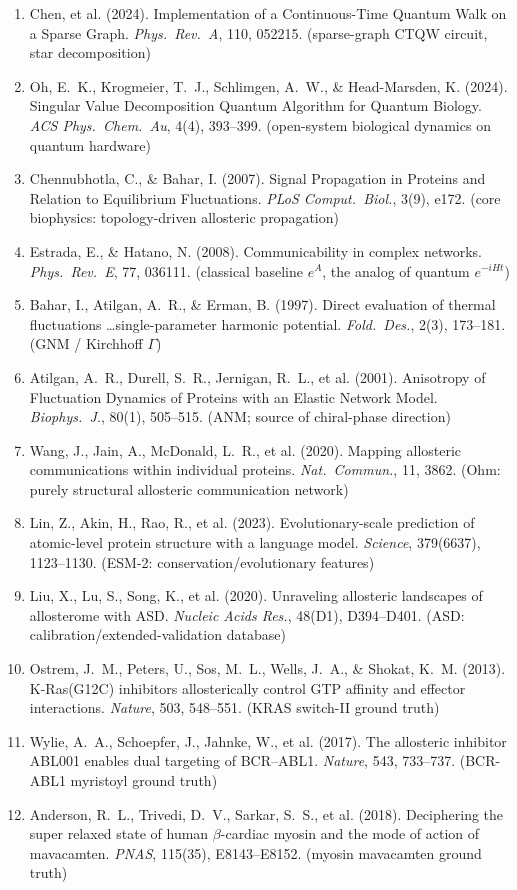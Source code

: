 \documentclass[11pt,a4paper]{article}
\newcommand{\note}[1]{{\color{grey}\small #1}}
\begin{document}
{\begin{enumerate}[leftmargin=1.6em,itemsep=1pt]
\item Chen, et al. (2024). Implementation of a Continuous-Time Quantum Walk on a Sparse Graph. \emph{Phys.\ Rev.\ A}, 110, 052215. \note{(sparse-graph CTQW circuit, star decomposition)}
\item Oh, E.~K., Krogmeier, T.~J., Schlimgen, A.~W., \& Head-Marsden, K. (2024). Singular Value Decomposition Quantum Algorithm for Quantum Biology. \emph{ACS Phys.\ Chem.\ Au}, 4(4), 393--399. \note{(open-system biological dynamics on quantum hardware)}
\item Chennubhotla, C., \& Bahar, I. (2007). Signal Propagation in Proteins and Relation to Equilibrium Fluctuations. \emph{PLoS Comput.\ Biol.}, 3(9), e172. \note{(core biophysics: topology-driven allosteric propagation)}
\item Estrada, E., \& Hatano, N. (2008). Communicability in complex networks. \emph{Phys.\ Rev.\ E}, 77, 036111. \note{(classical baseline $e^{A}$, the analog of quantum $e^{-iHt}$)}
\item Bahar, I., Atilgan, A.~R., \& Erman, B. (1997). Direct evaluation of thermal fluctuations \ldots single-parameter harmonic potential. \emph{Fold.\ Des.}, 2(3), 173--181. \note{(GNM / Kirchhoff $\Gamma$)}
\item Atilgan, A.~R., Durell, S.~R., Jernigan, R.~L., et al. (2001). Anisotropy of Fluctuation Dynamics of Proteins with an Elastic Network Model. \emph{Biophys.\ J.}, 80(1), 505--515. \note{(ANM; source of chiral-phase direction)}
\item Wang, J., Jain, A., McDonald, L.~R., et al. (2020). Mapping allosteric communications within individual proteins. \emph{Nat.\ Commun.}, 11, 3862. \note{(Ohm: purely structural allosteric communication network)}
\item Lin, Z., Akin, H., Rao, R., et al. (2023). Evolutionary-scale prediction of atomic-level protein structure with a language model. \emph{Science}, 379(6637), 1123--1130. \note{(ESM-2: conservation/evolutionary features)}
\item Liu, X., Lu, S., Song, K., et al. (2020). Unraveling allosteric landscapes of allosterome with ASD. \emph{Nucleic Acids Res.}, 48(D1), D394--D401. \note{(ASD: calibration/extended-validation database)}
\item Ostrem, J.~M., Peters, U., Sos, M.~L., Wells, J.~A., \& Shokat, K.~M. (2013). K-Ras(G12C) inhibitors allosterically control GTP affinity and effector interactions. \emph{Nature}, 503, 548--551. \note{(KRAS switch-II ground truth)}
\item Wylie, A.~A., Schoepfer, J., Jahnke, W., et al. (2017). The allosteric inhibitor ABL001 enables dual targeting of BCR--ABL1. \emph{Nature}, 543, 733--737. \note{(BCR-ABL1 myristoyl ground truth)}
\item Anderson, R.~L., Trivedi, D.~V., Sarkar, S.~S., et al. (2018). Deciphering the super relaxed state of human $\beta$-cardiac myosin and the mode of action of mavacamten. \emph{PNAS}, 115(35), E8143--E8152. \note{(myosin mavacamten ground truth)}
\end{enumerate}}
\end{document}
